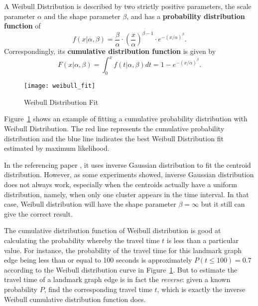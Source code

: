 \begin{theorem}\label{Theorem: weibull_dist}
A Weibull Distribution is described by two strictly positive parameters, the scale parameter $\alpha$ and the shape parameter $\beta$, and has a \textbf{probability distribution function} of \cite{WEDI}
\begin{equation}
f(x | \alpha, \beta) = \frac{\beta}{\alpha}\cdot(\frac{x}{\alpha})^{\beta - 1}\cdot e^{-(x / \alpha)^{\beta}}.
\end{equation}
Correspondingly, its \textbf{cumulative distribution function} is given by \cite{WEIB}
\begin{equation}
F(x | \alpha, \beta) = \int_{0}^{x} f(t | \alpha, \beta) dt = 1 - e^{-(x / \alpha)^{\beta}}.
\end{equation}
\end{theorem}

\begin{figure}[h!]
\texttt{[image: weibull\_fit]}
\centering
\caption{Weibull Distribution Fit}\label{Fig:weibull_fit}
\end{figure}

Figure~\ref{Fig:weibull_fit} shows an example of fitting a cumulative probability distribution with Weibull Distribution. The red line represents the cumulative probability distribution and the blue line indicates the best Weibull Distribution fit estimated by maximum likelihood. 

In the referencing paper \cite{TDR10}, it uses inverse Gaussian distribution to fit the centroid distribution. However, as some experiments showed, inverse Gaussian distribution does not always work, especially when the centroids actually have a uniform distribution, namely, when only one cluster appears in the time interval. In that case, Weibull distribution will have the shape parameter $\beta = \infty$ but it still can give the correct result. 

The cumulative distribution function of Weibull distribution is good at calculating the probability whereby the travel time $t$ is less than a particular value. For instance, the probability of the travel time for this landmark graph edge being less than or equal to 100 seconds is approximately $P(t\leq100) = 0.7$ according to the Weibull distribution curve in Figure~\ref{Fig:weibull_fit}. But to estimate the travel time of a landmark graph edge is in fact the \emph{reverse}: given a known probability $P$, find the corresponding travel time $t$, which is exactly the inverse Weibull cumulative distribution function does. 

